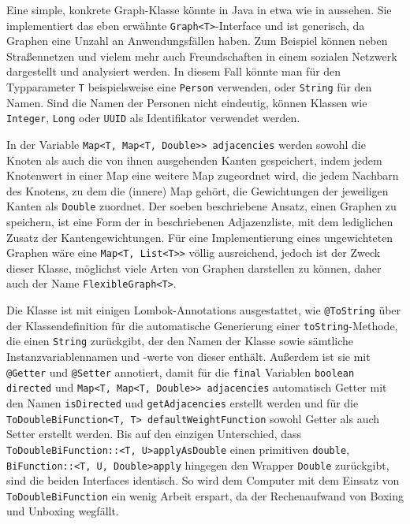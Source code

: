             
            
            Eine simple, konkrete Graph-Klasse könnte in Java in etwa wie in  aussehen. Sie implementiert das eben erwähnte \lstinline{Graph<T>}-Interface und ist generisch, da Graphen eine Unzahl an Anwendungsfällen haben. Zum Beispiel können neben Straßennetzen und vielem mehr auch Freundschaften in einem sozialen Netzwerk dargestellt und analysiert werden. In diesem Fall könnte man für den Typparameter \lstinline{T} beispielsweise eine \lstinline{Person} verwenden, oder \lstinline{String} für den Namen. Sind die Namen der Personen nicht eindeutig, können Klassen wie \lstinline{Integer}, \lstinline{Long} oder \lstinline{UUID} als Identifikator verwendet werden. \cite{EZ:Web21, EZ:Web45, EZ:Web46}
    
            In der Variable \lstinline{Map<T, Map<T, Double>> adjacencies} werden sowohl die Knoten als auch die von ihnen ausgehenden Kanten gespeichert, indem jedem Knotenwert in einer Map eine weitere Map zugeordnet wird, die jedem Nachbarn des Knotens, zu dem die (innere) Map gehört, die Gewichtungen der jeweiligen Kanten als \lstinline{Double} zuordnet. Der soeben beschriebene Ansatz, einen Graphen zu speichern, ist eine Form der in  beschriebenen Adjazenzliste, mit dem lediglichen Zusatz der Kantengewichtungen. Für eine Implementierung eines ungewichteten Graphen wäre eine \lstinline{Map<T, List<T>>} völlig ausreichend, jedoch ist der Zweck dieser Klasse, möglichst viele Arten von Graphen darstellen zu können, daher auch der Name \lstinline{FlexibleGraph<T>}.

            Die Klasse ist mit einigen Lombok-Annotations ausgestattet, wie \zb \lstinline{@ToString} über der Klassendefinition für die automatische Generierung einer \lstinline{toString}-Methode, die einen \lstinline{String} zurückgibt, der den Namen der Klasse sowie sämtliche Instanzvariablennamen und -werte von dieser enthält. Außerdem ist sie mit \lstinline{@Getter} und \lstinline{@Setter} annotiert, damit für die \lstinline{final} Variablen \lstinline{boolean directed} und \lstinline{Map<T, Map<T, Double>> adjacencies} automatisch Getter mit den Namen \lstinline{isDirected} und \lstinline{getAdjacencies} erstellt werden und für die \lstinline{ToDoubleBiFunction<T, T> defaultWeightFunction} sowohl Getter als auch Setter erstellt werden. Bis auf den einzigen Unterschied, dass \lstinline{ToDoubleBiFunction::<T, U>applyAsDouble} einen primitiven \lstinline{double}, \lstinline{BiFunction::<T, U, Double>apply} hingegen den Wrapper \lstinline{Double} zurückgibt, sind die beiden Interfaces identisch. So wird dem Computer mit dem Einsatz von \lstinline{ToDoubleBiFunction} ein wenig Arbeit erspart, da der Rechenaufwand von Boxing und Unboxing wegfällt.
            
